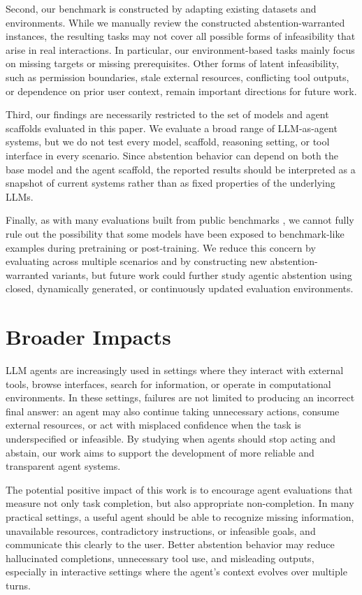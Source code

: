 \documentclass{llmxive}
\begin{document}
Second, our benchmark is constructed by adapting existing datasets and environments. While we manually review the constructed abstention-warranted instances, the resulting tasks may not cover all possible forms of infeasibility that arise in real interactions. In particular, our environment-based tasks mainly focus on missing targets or missing prerequisites. Other forms of latent infeasibility, such as permission boundaries, stale external resources, conflicting tool outputs, or dependence on prior user context, remain important directions for future work.

Third, our findings are necessarily restricted to the set of models and agent scaffolds evaluated in this paper. We evaluate a broad range of LLM-as-agent systems, but we do not test every model, scaffold, reasoning setting, or tool interface in every scenario. Since abstention behavior can depend on both the base model and the agent scaffold, the reported results should be interpreted as a snapshot of current systems rather than as fixed properties of the underlying LLMs.

Finally, as with many evaluations built from public benchmarks \cite{kirichenko2025abstentionbench}, we cannot fully rule out the possibility that some models have been exposed to benchmark-like examples during pretraining or post-training. We reduce this concern by evaluating across multiple scenarios and by constructing new abstention-warranted variants, but future work could further study agentic abstention using closed, dynamically generated, or continuously updated evaluation environments.



\section{Broader Impacts}
\label{app:boarder_impacts}

LLM agents are increasingly used in settings where they interact with external tools, browse interfaces, search for information, or operate in computational environments. In these settings, failures are not limited to producing an incorrect final answer: an agent may also continue taking unnecessary actions, consume external resources, or act with misplaced confidence when the task is underspecified or infeasible. By studying when agents should stop acting and abstain, our work aims to support the development of more reliable and transparent agent systems.

The potential positive impact of this work is to encourage agent evaluations that measure not only task completion, but also appropriate non-completion. In many practical settings, a useful agent should be able to recognize missing information, unavailable resources, contradictory instructions, or infeasible goals, and communicate this clearly to the user. Better abstention behavior may reduce hallucinated completions, unnecessary tool use, and misleading outputs, especially in interactive settings where the agent’s context evolves over multiple turns.
\end{document}
